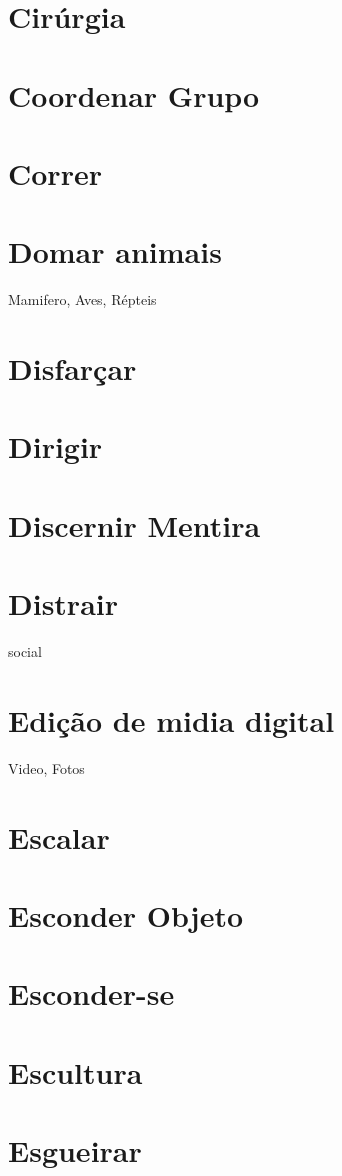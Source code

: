 \section{Cirúrgia}
\section{Coordenar Grupo} %
\section{Correr}
\section{Domar animais} Mamifero, Aves, Répteis
\section{Disfarçar}
\section{Dirigir}
\section{Discernir Mentira}
\section{Distrair} social
\section{Edição de midia digital} Video, Fotos
\section{Escalar}
\section{Esconder Objeto}%
\section{Esconder-se}
\section{Escultura}
\section{Esgueirar}
